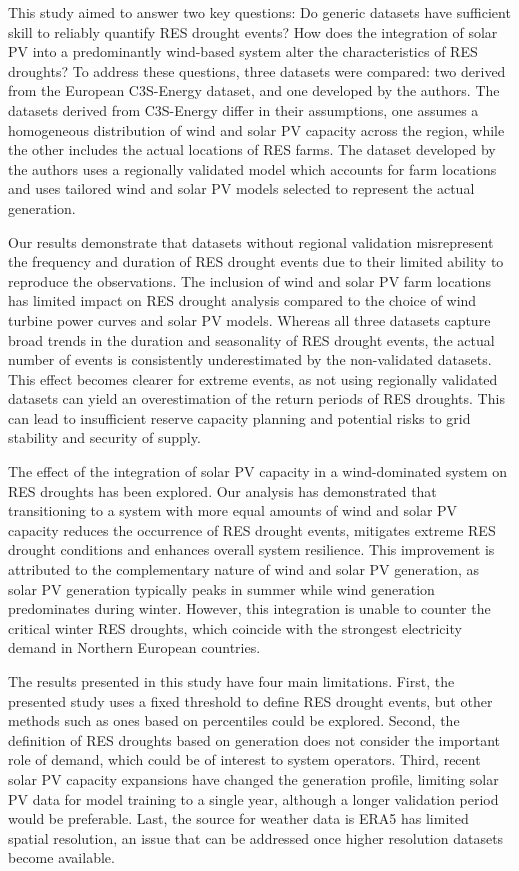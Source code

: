 \documentclass[preprint, 12pt]{elsarticle}
\begin{document}
This study aimed to answer two key questions: Do generic datasets have sufficient skill to reliably quantify RES drought events? How does the integration of solar PV into a predominantly wind-based system alter the characteristics of RES droughts? To address these questions, three datasets were compared: two derived from the European C3S-Energy dataset, and one developed by the authors. The datasets derived from C3S-Energy differ in their assumptions, one assumes a homogeneous distribution of wind and solar PV capacity across the region, while the other includes the actual locations of RES farms. The dataset developed by the authors uses a regionally validated model which accounts for farm locations and uses tailored wind and solar PV models selected to represent the actual generation.

Our results demonstrate that datasets without regional validation misrepresent the frequency and duration of RES drought events due to their limited ability to reproduce the observations. The inclusion of wind and solar PV farm locations has limited impact on RES drought analysis compared to the choice of wind turbine power curves and solar PV models. Whereas all three datasets capture broad trends in the duration and seasonality of RES drought events, the actual number of events is consistently underestimated by the non-validated datasets. This effect becomes clearer for extreme events, as not using regionally validated datasets can yield an overestimation of the return periods of RES droughts. This can lead to insufficient reserve capacity planning and potential risks to grid stability and security of supply.

The effect of the integration of solar PV capacity in a wind-dominated system on RES droughts has been explored. Our analysis has demonstrated that transitioning to a system with more equal amounts of wind and solar PV capacity reduces the occurrence of RES drought events, mitigates extreme RES drought conditions and enhances overall system resilience. This improvement is attributed to the complementary nature of wind and solar PV generation, as solar PV generation typically peaks in summer while wind generation predominates during winter. However, this integration is unable to counter the critical winter RES droughts, which coincide with the strongest electricity demand in Northern European countries.

The results presented in this study have four main limitations. First, the presented study uses a fixed threshold to define RES drought events, but other methods such as ones based on percentiles could be explored. Second, the definition of RES droughts based on generation does not consider the important role of demand, which could be of interest to system operators. Third, recent solar PV capacity expansions have changed the generation profile, limiting solar PV data for model training to a single year, although a longer validation period would be preferable. Last, the source for weather data is ERA5 has limited spatial resolution, an issue that can be addressed once higher resolution datasets become available.
\end{document}
